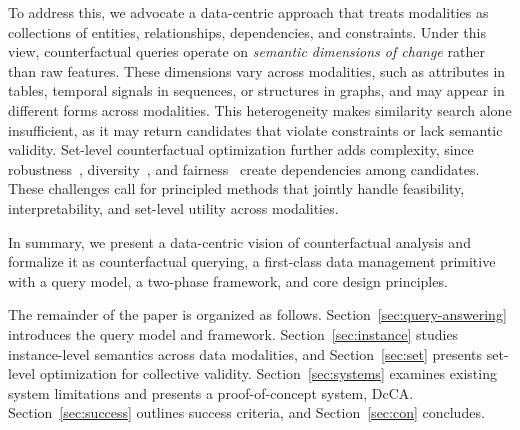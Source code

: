 To address this, we advocate a data-centric approach that treats modalities as collections of entities, relationships, dependencies, and constraints. Under this view, counterfactual queries operate on \emph{semantic dimensions of change} rather than raw features. These dimensions vary across modalities, such as attributes in tables, temporal signals in sequences, or structures in graphs, and may appear in different forms across modalities. This heterogeneity makes similarity search alone insufficient, as it may return candidates that violate constraints or lack semantic validity. Set-level counterfactual optimization further adds complexity, since robustness~\cite{guyomard2023generating}, diversity~\cite{laugel2023achieving}, and fairness~\cite{kusner2017counterfactual} create dependencies among candidates. These challenges call for principled methods that jointly handle feasibility, interpretability, and set-level utility across modalities.

In summary, we present a data-centric vision of counterfactual analysis and formalize it as counterfactual querying, a first-class data management primitive with a query model, a two-phase framework, and core design principles. 

The remainder of the paper is organized as follows. Section~\ref{sec:query-answering} introduces the query model and framework. Section~\ref{sec:instance} studies instance-level semantics across data modalities, and Section~\ref{sec:set} presents set-level optimization for collective validity. Section~\ref{sec:systems} examines existing system limitations and presents a proof-of-concept system, DcCA. Section~\ref{sec:success} outlines success criteria, and Section~\ref{sec:con} concludes.

 




